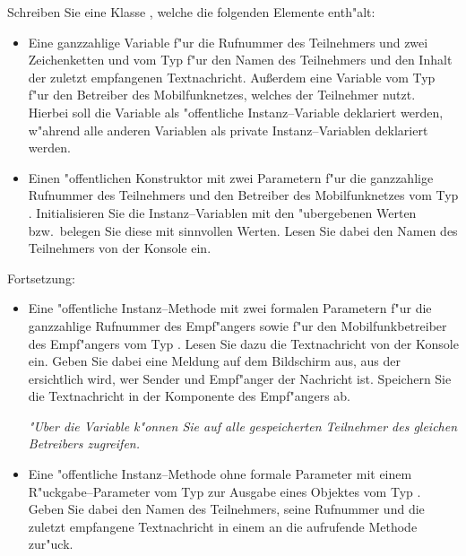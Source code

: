 \documentclass[c,18pt]{beamer}
\begin{document}
\begin{frame}

Schreiben Sie eine Klasse , welche die folgenden
Elemente enth"alt:
\begin{itemize}
\item
Eine ganzzahlige Variable 
f"ur die Rufnummer des Teilnehmers und zwei Zeichenketten  und  vom Typ 
f"ur den Namen des Teilnehmers und den Inhalt der zuletzt
empfangenen Textnachricht. Au\ss erdem eine Variable 
vom Typ   f"ur den Betreiber des Mobilfunknetzes, welches der Teilnehmer nutzt. \\
Hierbei soll die Variable  als "offentliche Instanz--Variable deklariert werden,
w"ahrend alle anderen Variablen als private Instanz--Variablen deklariert werden.
\item
Einen "offentlichen Konstruktor mit zwei Parametern f"ur die
ganzzahlige Rufnummer des Teilnehmers und den Betreiber des
Mobilfunknetzes vom Typ . Initialisieren Sie
die Instanz--Variablen mit den "ubergebenen Werten bzw.\ belegen
Sie diese mit sinnvollen Werten.
Lesen Sie dabei den Namen des Teilnehmers von der Konsole ein.
\end{itemize}
\end{frame}

\begin{frame}
Fortsetzung:
\begin{itemize}
\item
Eine "offentliche Instanz--Methode 
mit zwei formalen Parametern f"ur die ganzzahlige Rufnummer des Empf"angers sowie
f"ur den Mobilfunkbetreiber des Empf"angers vom Typ .
Lesen Sie dazu die Textnachricht von der Konsole ein. Geben Sie dabei
eine Meldung auf dem Bildschirm aus, aus der ersichtlich wird,
wer Sender und Empf"anger der Nachricht ist.
Speichern Sie die Textnachricht in der Komponente  des Empf"angers ab.

\emph{"Uber die Variable  k"onnen Sie auf alle gespeicherten Teilnehmer  des gleichen Betreibers zugreifen.}

\item
Eine "offentliche Instanz--Methode  ohne formale Parameter mit einem
R"uckgabe--Parameter vom Typ  zur Ausgabe eines
Objektes vom Typ .
Geben Sie dabei den Namen des Teilnehmers,
seine Rufnummer und die zuletzt empfangene
Textnachricht in einem  an die aufrufende Methode zur"uck.
\end{itemize}
\end{frame}
\end{document}
